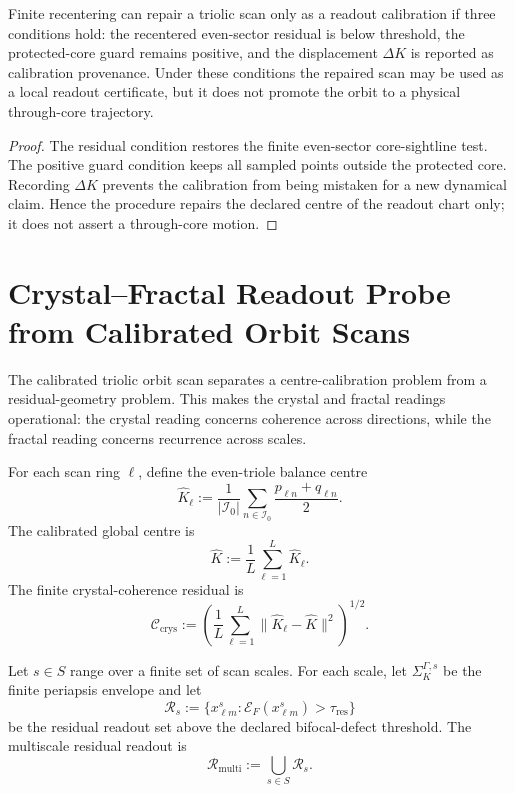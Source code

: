 \begin{theorem}
\label{thm:core-recentering-guard}
Finite recentering can repair a triolic scan only as a readout calibration if
three conditions hold: the recentered even-sector residual is below threshold,
the protected-core guard remains positive, and the displacement \(\Delta K\) is
reported as calibration provenance.  Under these conditions the repaired scan
may be used as a local readout certificate, but it does not promote the orbit to
a physical through-core trajectory.
\end{theorem}

\begin{proof}
The residual condition restores the finite even-sector core-sightline test.
The positive guard condition keeps all sampled points outside the protected
core.  Recording \(\Delta K\) prevents the calibration from being mistaken for a
new dynamical claim.  Hence the procedure repairs the declared centre of the
readout chart only; it does not assert a through-core motion.
\end{proof}



\section{Crystal--Fractal Readout Probe from Calibrated Orbit Scans}
\label{sec:crystal-fractal-readout-probe}

The calibrated triolic orbit scan separates a centre-calibration problem from
a residual-geometry problem.  This makes the crystal and fractal readings
operational: the crystal reading concerns coherence across directions, while
the fractal reading concerns recurrence across scales.

\begin{definition}
For each scan ring \(\ell\), define the even-triole balance centre
\[
    \widehat K_\ell
    :=
    \frac{1}{|\mathcal I_0|}
    \sum_{n\in\mathcal I_0}
    \frac{p_{\ell n}+q_{\ell n}}{2}.
\]
The calibrated global centre is
\[
    \widehat K
    :=
    \frac{1}{L}\sum_{\ell=1}^{L}\widehat K_\ell.
\]
The finite crystal-coherence residual is
\[
    \mathcal C_{\mathrm{crys}}
    :=
    \left(
    \frac{1}{L}
    \sum_{\ell=1}^{L}
    \|\widehat K_\ell-\widehat K\|^2
    \right)^{1/2}.
\]
\end{definition}

\begin{definition}
Let \(s\in S\) range over a finite set of scan scales.  For each scale, let
\(\Sigma_K^{\Gamma,s}\) be the finite periapsis envelope and let
\[
    \mathcal R_s
    :=
    \{x_{\ell m}^{s}:\mathcal E_F(x_{\ell m}^{s})>\tau_{\mathrm{res}}\}
\]
be the residual readout set above the declared bifocal-defect threshold.  The
multiscale residual readout is
\[
    \mathcal R_{\mathrm{multi}}
    :=
    \bigcup_{s\in S}\mathcal R_s.
\]
\end{definition}

